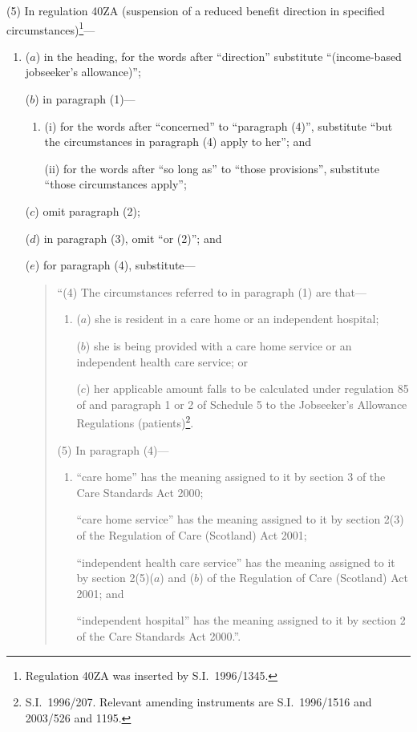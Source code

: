 \documentclass[12pt,a4paper]{article}
\begin{document}
(5) In regulation 40ZA (suspension of a reduced benefit direction in specified circumstances)\footnote{Regulation 40ZA was inserted by S.I.\ 1996/1345.}—
\begin{enumerate}\item[]
($a$) in the heading, for the words after “direction” substitute “(income-based jobseeker’s allowance)”;

($b$) in paragraph (1)—
\begin{enumerate}\item[]
(i) for the words after “concerned” to “paragraph (4)”, substitute “but the circumstances in paragraph (4) apply to her”; and

(ii) for the words after “so long as” to “those provisions”, substitute “those circumstances apply”;
\end{enumerate}

($c$) omit paragraph (2);

($d$) in paragraph (3), omit “or (2)”; and

($e$) for paragraph (4), substitute—
\begin{quotation}
“(4) The circumstances referred to in paragraph (1) are that—
\begin{enumerate}\item[]
($a$) she is resident in a care home or an independent hospital;

($b$) she is being provided with a care home service or an independent health care service; or

($c$) her applicable amount falls to be calculated under regulation 85 of and paragraph 1 or 2 of Schedule 5 to the Jobseeker’s Allowance Regulations (patients)\footnote{S.I.\ 1996/207. Relevant amending instruments are S.I.\ 1996/1516 and 2003/526 and 1195.}.
\end{enumerate}

(5) In paragraph (4)—
\begin{enumerate}\item[]
“care home” has the meaning assigned to it by section 3 of the Care Standards Act 2000;

“care home service” has the meaning assigned to it by section 2(3) of the Regulation of Care (Scotland) Act 2001;

“independent health care service” has the meaning assigned to it by section 2(5)($a$)  and ($b$)  of the Regulation of Care (Scotland) Act 2001; and

“independent hospital” has the meaning assigned to it by section 2 of the Care Standards Act 2000.”.
\end{enumerate}
\end{quotation}
\end{enumerate}
\end{document}
